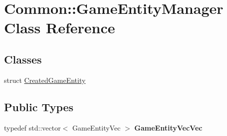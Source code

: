 \hypertarget{class_common_1_1_game_entity_manager}{}\section{Common\+:\+:Game\+Entity\+Manager Class Reference}
\label{class_common_1_1_game_entity_manager}
\subsection*{Classes}
\begin{DoxyCompactItemize}
\item 
struct \hyperlink{struct_common_1_1_game_entity_manager_1_1_created_game_entity}{Created\+Game\+Entity}
\end{DoxyCompactItemize}
\subsection*{Public Types}
\begin{DoxyCompactItemize}
\item 
\mbox{\label{class_common_1_1_game_entity_manager_a661304519d61a1bccf8fd1889cb56964}} 
typedef std\+::vector$<$ Game\+Entity\+Vec $>$ {\bfseries Game\+Entity\+Vec\+Vec}
\end{DoxyCompactItemize}
